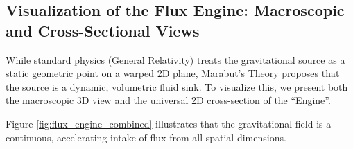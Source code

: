 \documentclass[11pt, a4paper]{article}
\begin{document}
\clearpage
\subsection{Visualization of the Flux Engine: Macroscopic and Cross-Sectional Views}

While standard physics (General Relativity) treats the gravitational source as a static geometric point on a warped 2D plane, Marab\={u}t's Theory proposes that the source is a dynamic, volumetric fluid sink. To visualize this, we present both the macroscopic 3D view and the universal 2D cross-section of the ``Engine''.

Figure \ref{fig:flux_engine_combined} illustrates that the gravitational field is a continuous, accelerating intake of flux from all spatial dimensions.
\end{document}

